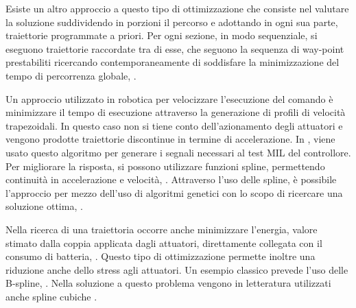 Esiste un altro approccio a questo tipo di ottimizzazione che consiste nel valutare la soluzione suddividendo in porzioni il percorso e adottando in ogni sua parte, traiettorie programmate a priori. Per ogni sezione, in modo sequenziale, si eseguono traiettorie raccordate tra di esse, che seguono la sequenza di way-point prestabiliti ricercando contemporaneamente di soddisfare la minimizzazione del tempo di percorrenza globale, \cite{HowieChoset2005PoRM}. 

Un approccio utilizzato in robotica per velocizzare l'esecuzione del comando è minimizzare il tempo di esecuzione attraverso la generazione di profili di velocità trapezoidali. In questo caso non si tiene conto dell'azionamento degli attuatori e vengono prodotte traiettorie discontinue in termine di accelerazione. In \cite{DesTestCarm}, viene usato questo algoritmo per generare i segnali necessari al test MIL del controllore.
Per migliorare la risposta, si possono utilizzare funzioni spline, permettendo continuità in accelerazione e velocità, \cite{baseTesi}.
Attraverso l'uso delle spline, è possibile l'approccio per mezzo dell'uso di algoritmi genetici con lo scopo di ricercare una soluzione ottima, \cite{PathPlannigOverview}.

Nella ricerca di una traiettoria occorre anche minimizzare l'energia, valore stimato dalla coppia applicata dagli attuatori, direttamente collegata con il consumo di batteria, \cite{PathPlannigOverview}. Questo tipo di ottimizzazione permette inoltre una riduzione anche dello stress agli attuatori. Un esempio classico prevede l'uso delle B-spline, \cite{MartinBryanJ1999MMfO}. Nella soluzione a questo problema vengono in letteratura utilizzati anche spline cubiche \cite{Shin1986ADP}.



